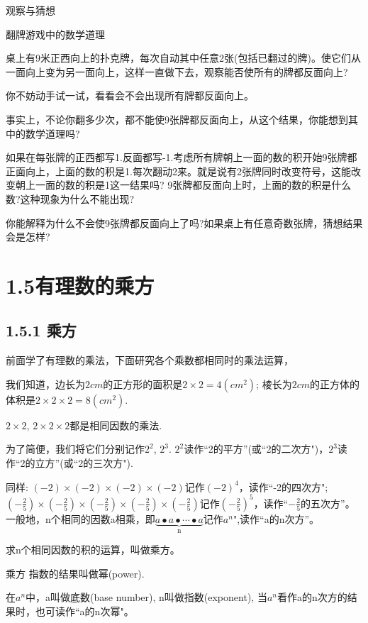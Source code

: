 \documentclass{article}
\begin{document}
观察与猜想

翻牌游戏中的数学道理

桌上有9米正西向上的扑克牌，每次自动其中任意2张(包括已翻过的牌)。使它们从一面向上变为另一面向上，这样一直做下去，观察能否使所有的牌都反面向上?

你不妨动手试一试，看看会不会出现所有牌都反面向上。

事实上，不论你翻多少次，都不能使9张牌都反面向上，从这个结果，你能想到其中的数学道理吗?

如果在每张牌的正西都写1.反面都写-1.考虑所有牌朝上一面的数的积开始9张牌都正面向上，上面的数的积是1.每次翻动2来。就是说有2张牌同时改变符号，这能改变朝上一面的数的积是1这一结果吗? 9张牌都反面向上时，上面的数的积是什么数?这种现象为什么不能出现?

你能解释为什么不会使9张牌都反面向上了吗?如果桌上有任意奇数张牌，猜想结果会是怎样?



\section*{1.5有理数的乘方}
\subsection*{1.5.1 乘方}

前面学了有理数的乘法，下面研究各个乘数都相同时的乘法运算，

我们知道，边长为$2cm$的正方形的面积是$2\times2=4(cm^2)$; 棱长为$2cm$的正方体的体积是$2\times2\times2=8(cm^2)$.

$2\times2$, $2\times2\times2$都是相同因数的乘法.

为了简便，我们将它们分别记作$2^2$, $2^3$. $2^2$读作“2的平方”(或“2的二次方")，$2^3$读作“2的立方”(或“2的三次方").

同样:
$(-2)\times(-2)\times(-2)\times(-2)$记作$(-2)^4$，读作“-2的四次方";$(-\frac{2}{5})\times(-\frac{2}{5})\times(-\frac{2}{5})\times(-\frac{2}{5})\times(-\frac{2}{5})$记作$(-\frac{2}{5})^5$，读作“$-\frac{2}{5}$的五次方”。
一般地，n个相同的因数a相乘，即$\underbrace{a\bullet a\bullet\cdots\bullet a}_{\text{n}} $记作$a^n$",读作“a的n次方”。


\begin{definition}
求n个相同因数的积的运算，叫做乘方。
\end{definition}

\begin{definition}
乘方  指数的结果叫做幂(power). 
\end{definition}
\begin{definition}
在$a^n$中，a叫做底数(base number), n叫做指数(exponent), 当$a^n$看作a的n次方的结果时，也可读作“a的n次幂"。
\end{definition}
\end{document}
